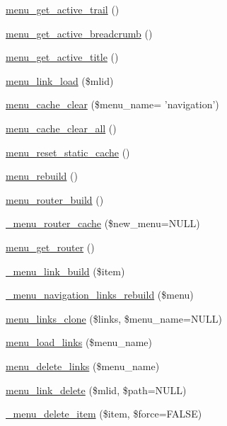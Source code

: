 \begin{DoxyCompactItemize}
\item 
\hyperlink{group__menu_ga55105d602c5c5ea5b39aae25aa47f8c5}{menu\_\-get\_\-active\_\-trail} ()
\item 
\hyperlink{group__menu_ga009731c4b3e736ebb620ba90e7f04207}{menu\_\-get\_\-active\_\-breadcrumb} ()
\item 
\hyperlink{group__menu_gaf0a358447097959e53ad1a20b8d811ed}{menu\_\-get\_\-active\_\-title} ()
\item 
\hyperlink{group__menu_gac2b338fa3a449c826661aade7a7d486e}{menu\_\-link\_\-load} (\$mlid)
\item 
\hyperlink{group__menu_ga032d6b78c7deab10685ebfa6f32ad7eb}{menu\_\-cache\_\-clear} (\$menu\_\-name= 'navigation')
\item 
\hyperlink{group__menu_ga0a10fa44ca152a12091747e515b6a655}{menu\_\-cache\_\-clear\_\-all} ()
\item 
\hyperlink{group__menu_ga1475a636851e8c953db72e5b1ab2c0f0}{menu\_\-reset\_\-static\_\-cache} ()
\item 
\hyperlink{group__menu_gaf36dcb9d5491ef5e7d2cf22c1f5c69f4}{menu\_\-rebuild} ()
\item 
\hyperlink{group__menu_ga1f6713b93173302fb29d7bc9578b7530}{menu\_\-router\_\-build} ()
\item 
\hyperlink{group__menu_ga02af3d3800722e9ff5be36485b655905}{\_\-menu\_\-router\_\-cache} (\$new\_\-menu=NULL)
\item 
\hyperlink{group__menu_ga7140ecddb2c59ae8acc74968eb339e67}{menu\_\-get\_\-router} ()
\item 
\hyperlink{group__menu_gadf1f694a2079dcdd6526150eb195915b}{\_\-menu\_\-link\_\-build} (\$item)
\item 
\hyperlink{group__menu_ga69fdf86c20d033bc7ba46a14937e20ea}{\_\-menu\_\-navigation\_\-links\_\-rebuild} (\$menu)
\item 
\hyperlink{group__menu_ga327aef442c1c6c4b2a7d14742f37af2a}{menu\_\-links\_\-clone} (\$links, \$menu\_\-name=NULL)
\item 
\hyperlink{group__menu_gac82038848d5c321b972769ff821d4aa1}{menu\_\-load\_\-links} (\$menu\_\-name)
\item 
\hyperlink{group__menu_gade553e3a51918b9290425df7f775aa14}{menu\_\-delete\_\-links} (\$menu\_\-name)
\item 
\hyperlink{group__menu_gacb2dddc8ca84476f38a90f4487156b12}{menu\_\-link\_\-delete} (\$mlid, \$path=NULL)
\item 
\hyperlink{group__menu_gaf60be5755b46e635c04963e61cdc809a}{\_\-menu\_\-delete\_\-item} (\$item, \$force=FALSE)

\end{DoxyCompactItemize}
